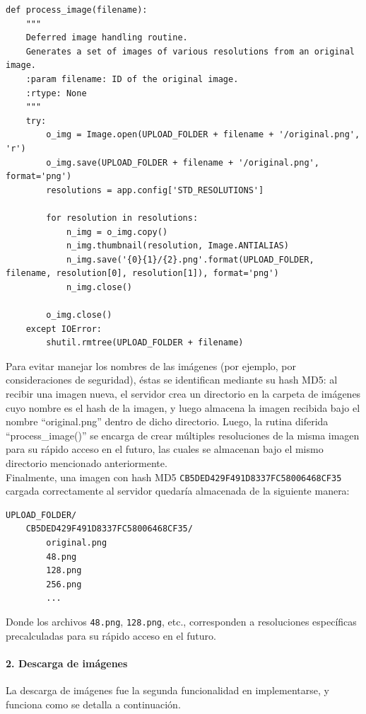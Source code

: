 \documentclass[11pt,letterpaper]{article}
\begin{document}
\begin{lstlisting}
def process_image(filename):
    """
    Deferred image handling routine.
    Generates a set of images of various resolutions from an original image.
    :param filename: ID of the original image.
    :rtype: None
    """
    try:
        o_img = Image.open(UPLOAD_FOLDER + filename + '/original.png', 'r')
        o_img.save(UPLOAD_FOLDER + filename + '/original.png', format='png')
        resolutions = app.config['STD_RESOLUTIONS']

        for resolution in resolutions:
            n_img = o_img.copy()
            n_img.thumbnail(resolution, Image.ANTIALIAS)
            n_img.save('{0}{1}/{2}.png'.format(UPLOAD_FOLDER, filename, resolution[0], resolution[1]), format='png')
            n_img.close()

        o_img.close()
    except IOError:
        shutil.rmtree(UPLOAD_FOLDER + filename)
\end{lstlisting}

Para evitar manejar los nombres de las imágenes (por ejemplo, por consideraciones de seguridad), éstas se identifican mediante su hash MD5: al recibir una imagen nueva, el servidor crea un directorio en la carpeta de imágenes cuyo nombre es el hash de la imagen, y luego almacena la imagen recibida bajo el nombre ``original.png'' dentro de dicho directorio. Luego, la rutina diferida ``process\_image()'' se encarga de crear múltiples resoluciones de la misma imagen para su rápido acceso en el futuro, las cuales se almacenan bajo el mismo directorio mencionado anteriormente.\\

Finalmente, una imagen con hash MD5 \texttt{CB5DED429F491D8337FC58006468CF35} cargada correctamente al servidor quedaría almacenada de la siguiente manera:
\begin{verbatim}
UPLOAD_FOLDER/
    CB5DED429F491D8337FC58006468CF35/
        original.png
        48.png
        128.png
        256.png
        ...
\end{verbatim}

Donde los archivos \texttt{48.png}, \texttt{128.png}, etc., corresponden a resoluciones específicas precalculadas para su rápido acceso en el futuro.

\paragraph{2. Descarga de imágenes}

La descarga de imágenes fue la segunda funcionalidad en implementarse, y funciona como se detalla a continuación.
\end{document}
